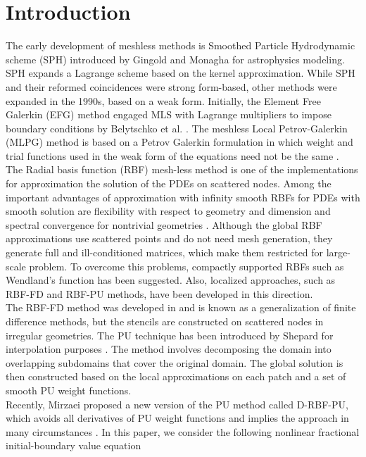 \documentclass[9pt]{article}
\numberwithin{equation}{section}
\begin{document}
\section{Introduction}\label{Sec1}
The early development of meshless methods is Smoothed Particle Hydrodynamic scheme (SPH) introduced by Gingold and Monagha \cite{Monagha} for astrophysics modeling. SPH expands a Lagrange scheme based on the kernel approximation. While SPH and their reformed coincidences were strong form-based, other methods were expanded in the 1990s, based on a weak form. Initially, the Element Free Galerkin (EFG) method engaged MLS with Lagrange multipliers to impose boundary conditions by Belytschko et al. \cite{Belytschko}. The meshless Local Petrov-Galerkin (MLPG) method is based on a Petrov Galerkin formulation in which weight and trial functions used in the weak form of the equations need not be the same \cite{Atluri}.\\
The Radial basis function (RBF) mesh-less method is one of the implementations for approximation the solution of the PDEs on scattered nodes. Among the important advantages of approximation with infinity smooth RBFs for PDEs with smooth solution are flexibility with respect to geometry and dimension and spectral convergence for nontrivial geometries \cite{Rieger1,Rieger2}. Although the global RBF approximations use scattered points and do not need mesh generation, they generate full and ill-conditioned matrices, which make them restricted for large-scale problem. To overcome this problems, compactly supported RBFs such as Wendland's function has been suggested. Also, localized approaches, such as RBF-FD and RBF-PU methods, have been developed in this direction.\\
The RBF-FD method was developed in \cite{Fornberg} and is known as a generalization of finite difference methods, but the stencils are constructed on scattered nodes in irregular geometries. The PU technique has been introduced by Shepard for interpolation purposes \cite{Shepard}. The method involves decomposing the domain into overlapping subdomains that cover the original domain. The global solution is then constructed based on the local approximations on each patch and a set of smooth PU weight functions.\\
Recently, Mirzaei proposed a new version of the PU method called D-RBF-PU, which avoids all derivatives of PU weight functions and implies the approach in many circumstances \cite{refk1}.
In this paper, we consider  the following nonlinear fractional initial-boundary value equation
\end{document}
